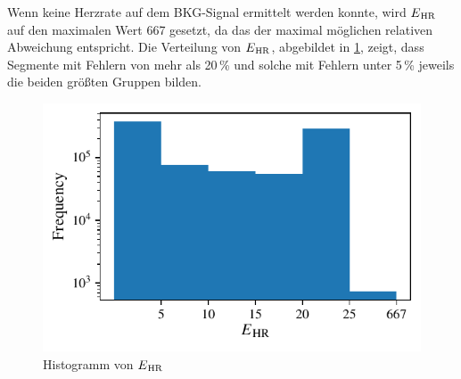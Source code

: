 	Wenn keine Herzrate auf dem \ac{BKG}-Signal ermittelt werden konnte, wird $E\textsubscript{HR}$ auf den maximalen Wert 667 gesetzt, da das der maximal möglichen relativen Abweichung entspricht. Die Verteilung von $E\textsubscript{HR}$, abgebildet in \ref{fig:class-histo}, zeigt, dass Segmente mit Fehlern von mehr als 20\,\% und solche mit Fehlern unter 5\,\% jeweils die beiden größten Gruppen bilden. 
	
	
	\begin{figure}[H]
		\centering
		\includegraphics{pic/data-E-HR-5-20.pdf}
		\caption[Histogramm von $E\textsubscript{HR}$]{Histogramm von $E\textsubscript{HR}$}
		\label{fig:class-histo}
	\end{figure}
	
	
	